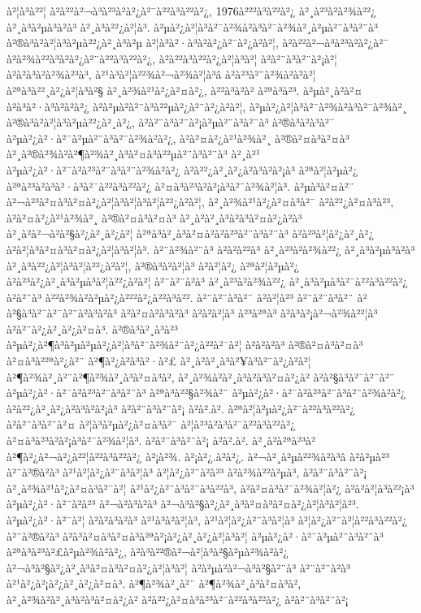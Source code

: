 à²¦à³à²²¦ à²à²²à²¬à³à²³à²à²¿à²¯à²²à³à²²à²¿, 1976à²²²à³à²²à²¿ à²¸à²³à²à²¾à²²¿ à²¸à³à²µà³à²à³ à²¸à³à²²¿à²¦à³. à²µà²¿à²¦à³à²¯à²¾à²­à³à²¯à²¾à²¸à²µà²¨à³à²¨à³ à²®à³à²à²¦à³à²µà²²¿à²¸à³à²µ à²¦à³à²·à³à²à²¿à²¯à²¿à²à²¦, à²à²²à²¬à³à²³à²à²¿à²¯ à²à²¾à²²à³à²à²¿à²¨à²²à³à²²à²¿, à²à²²à³à²²à²¿à²¦à³à²¦ à²à²¨à³à²¨à²¡à²¦ à²à²à³à²à²¾à²³à³, à²¹à³à²¦à²²¾à²¬à²¾à²¦à³â à²à²³à²¨à²¾à²à²à²¦ à²ªà³à²²¸à²¿à²¦à³à²§ à²¸à²¾à²¹à²¿à²¤à²¿, à²²à³à²à² à²ªà³à²³. à²µà²¸à²à²¤ à²à³à²·à³à²à²à²¿ à²à²µà²\circ à²¨à³à²²µà²¿à²¨à²¿à²à²¦, à²µà²¿à²¦à³à²¯à²¾à²­à³à²¯à²¾à²¸ à²®à³à²à²¦à³à²µà²²¿à²¸à²¿, à²à²¨à³à²¨à²¡à²µà²¨à³à²¨à³ à²®à³à²à³à²¯ à²µà²¿à²·à²¯à²µà²¨à³à²¨à²¾à²à²¿, à²à²¤à²¿à²¹à²¾à²¸ à²®à²¤à³à²¤à³ à²¸à²®à²¾à²à²¶à²¾à²¸à³à²¤à³à²²µà²¨à³à²¨à³ à²¸à²¹ à²µà²¿à²·à²¯à²à²³à²¨à³à²¨à²¾à²à²¿ à²à²²¿à²¸à²¿à²à³à²à²¡à³ à²ªà²¦à²µà²¿ à²ªà²³à²à³à²·à³à²¯à²²à³à²²à²¿ à²¤à³à²³à²à²¡à³à²¯à²¾à²¦à³. à²µà³à²¤à²¨ à²¬à²³à²¤à³à²¤à²¿à²¦à³à²¦à³à²¦à²²¿à²à²¦, à²¸à²¾à²¹à²¿à²¤à³à²¯ à²à²²¿à²¤à³à²³, à²à²¤à²¿à²¹à²¾à²¸ à²®à²¤à³à²¤à³ à²¸à²à²¸à³à²à³à²¤à²¿à²à³ à²¸à²à²¬à²à²§à²¿à²¸à²¿à²¦ à²ªà³à²¸à³à²¤à²à²à²³à²¨à³à²¨à³ à²à²³à²¦à²¿à²¸à²¿ à²à²¦à³à²¤à³à²¤à²¿à²¦à³à²¦à³. à²¨à²¾à²¨à³ à²à²à²²à³ à²¸à²³à²à²¾à²²¿ à²¸à³à²µà³à²à³ à²¸à³à²²¿à²¦à³à²¦à²²¿à²à²¦, à²®à³à²à²¦à³ à²à²¦à²¿ à²ªà²¦à²µà²¿ à²à²³à²¿à²¸à³à²µà³à²¦à²²¿à²à²¦ à²¨à²¨à²à³ à²¸à²³à²à²¾à²²¿ à²¸à³à²µà³à²¯à²²à³à²²à²¿ à²à²¨à³ à²²à²¾à²­à²µà²¿à²²²à²¿à²²à³à²². à²¨à²¨à³à²¨ à²à²¦à²³ à²¨à²¨à³à²¨ à²à²§à³à²¯à²¯à²¨à²à³à²à³ à²à²¤à²à³à²à³ à²à²à²¦à³ à²³à²ªà³ à²à³à²¡à²¬à²¾à²²¦à³ à²à²¨à²¿à²¸à²¿à²¤à³. à²®à³à²¸à³à²³ à²µà²¿à²¶à³à²µà²µà²¿à²¦à³à²¯à²¾à²¨à²¿à²²à²¯à²¦ à²à²à²à³ à²®à²¤à³à²¤à³ à²¤à³à²²ªà²¿à²¨ à²¶à²¿à²à³à²·à²£ à²¸à²à²¸à³à²¥à³à²¯à²¿à²à²¦ à²¶à²¾à²¸à²¨à²¶à²¾à²¸à³à²¤à³à²\circ, à²¸à²¾à²à²¸à³à²à³à²¤à²¿à² à²à²§à³à²¯à²¯à²¨ à²µà²¿à²·à²¯à²à²³à²¨à³à²¨à³ à²ªà³à²²§à²¾à²¨ à²µà²¿à²·à²¯à²à²³à²¨à³à²¨à²¾à²à²¿ à²à²²¿à²¸à²¿à²à³à²à²¡à³ à²à²¨à³à²¨à²¡ à²à².à². à²ªà²¦à²µà²¿à²¯à²²à³à²²à²¿ à²à²¨à³à²¨à²¤ à²¦à³à²µà²¿à²¤à³à²¯ à²¦à²³à²à³à²¯à²²à³à²²à²¿ à²¤à³à²³à²à²¡à³à²¯à²¾à²¦à³. à²à²¨à³à²¨à²¡ à²à².à². à²¸à²à²ªà²³à² à²¶à²¿à²¬à²¿à²²¦à²²à³à²²à²¿ à²¡à²¾. à²¡à²¿.à²à²¿. à²¬à²¸à²µà²²¾à²à³â à²à²µà²³ à²¨à²®à²à³ à²¹à²¦à²¿à²¨à³à²¦à³ à²¦à²¿à²¨à²à²³ à²à²¾à²²à²µà³, à²à²¨à³à²¨à²¡ à²¸à²¾à²¹à²¿à²¤à³à²¯à²¦ à²¹à²¿à²¨à³à²¨à³à²²à³, à²à²¤à³à²¯à²¾à²¦à²¿ à²à²à²¦à³à²²¡à³ à²µà²¿à²·à²¯à²à²³ à²¬à²à³à²à³ à²¬à³à²§à²¿à²¸à³à²¤à³à²¤à²¿à²¦à³à²¦à²³. à²µà²¿à²·à²¯à²¦ à²à²à³à²à³ à²¹à³à²à²¦à³, à²¹à²¦à²¿à²¨à³à²¦à³ à²¦à²¿à²¨à²¦à²²à³à²²à²¿ à²¨à²®à²à³ à²à³à²¤à³à²¤à³à²ªà²¡à²¿à²¸à²¿à²¦à³à²¦ à²µà²¿à²·à²¯à²µà²¨à³à²¨à³ à²ªà³à²³à²£à²µà²¾à²à²¿, à²à³à²²®à²¬à²¦à³à²§à²µà²¾à²à²¿ à²¬à³à²§à²¿à²¸à³à²¤à³à²¤à²¿à²¦à³à²¦ à²à²µà²\circ à²¬à³à²§à²¨à³ à²¨à²¨à²à³ à²¹à²¿à²¡à²¿à²¸à²¿à²¤à³. à²¶à²¾à²¸à²¨ à²¶à²¾à²¸à³à²¤à³à²\circ, à²¸à²¾à²à²¸à³à²à³à²¤à²¿à² à²à²²¿à²¤à³à²³à²¯à²²à³à²²à²¿ à²à²¨à³à²¨à²¡ 